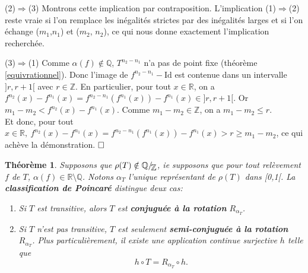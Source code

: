 \documentclass[11pt,a4 paper]{article}
\newtheorem{theoreme}{Théorème}[section]
\newcommand{\Rbb}{\mathbb{R}}
\newcommand{\Qbb}{\mathbb{Q}}
\newcommand*{\EnsembleQuotient}[2]%
{\ensuremath{%
		#1/\!\raisebox{-.65ex}{\ensuremath{\mathcal{#2}}}}}
\newenvironment{thm}{\begin{box_thm}\begin{theoreme}}{\end{theoreme}\end{box_thm}}
\begin{document}
	\par(2)$\Rightarrow$(3) Montrons cette implication par contraposition. L'implication (1)$\Rightarrow$(2) reste vraie si l'on remplace les inégalités strictes par des inégalités larges et si l'on échange ($m_1$,$n_1$) et ($m_2$, $n_2$), ce qui nous donne exactement l'implication recherchée.\\
	
	
	\par (3)$\Rightarrow$(1) Comme $\alpha(f) \notin \mathbb{Q}$, $T^{n_2 - n_1}$ n'a pas de point fixe (théorème \ref{equivrationnel}). Donc l'image de $f^{n_2 - n_1} - \mathrm{Id}$ est contenue dans un intervalle $]r,r+1[$ avec $r \in \mathbb{Z}$. En particulier, pour tout $x \in \Rbb$, on a $f^{n_2}(x) - f^{n_1}(x)=f^{n_2-n_1}(f^{n_1}(x))- f^{n_1}(x) \in ]r,r+1[$. Or $m_1 - m_2 < f^{n_2}(x)-f^{n_1}(x)$. Comme $m_1 - m_2 \in \mathbb{Z}$, on a $m_1 - m_2 \leq r$.\\
	Et donc, pour tout $x \in \mathbb{R}, \ f^{n_2}(x) - f^{n_1}(x) = f^{n_2-n_1}(f^{n_1}(x))- f^{n_1}(x)>r \geq m_1 - m_2$, ce qui achève la démonstration. $\hfill \square$\\










\begin{thm}\label{poincaré}
	Supposons que $\rho(T) \notin \EnsembleQuotient{\mathbb{Q}}{\mathbb{Z}}$, ie supposons que pour tout relèvement $ f$ de $T$, $\alpha(f) \in \Rbb\setminus \Qbb$. Notons $\alpha_T$ l'unique représentant de $\rho(T)$ dans [0,1[. La \textbf{classification de Poincaré} distingue deux cas:
	\begin{enumerate}
		\item Si $T$ est transitive, alors $T$ est \textbf{conjuguée à la rotation} $R_{\alpha_T}$.
		\item Si $T$ n'est pas transitive, $T$ est seulement \textbf{semi-conjuguée à la rotation} $R_{\alpha_T}$. Plus particulièrement, il existe une application continue surjective $h$ telle que $$h\circ T = R_{\alpha_T} \circ h.$$
	\end{enumerate}
\end{thm}
\end{document}
